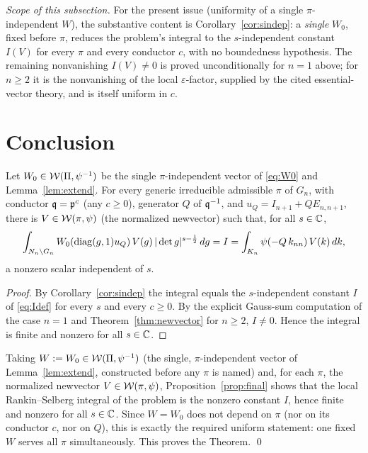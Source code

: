\medskip
\noindent\emph{Scope of this subsection.} For the present issue \textup{(}uniformity of a single
$\pi$-independent $W$\textup{)}, the substantive content is Corollary~\ref{cor:sindep}: a
\emph{single} $W_0$, fixed before $\pi$, reduces the problem's integral to the $s$-independent
constant $I(V)$ for every $\pi$ and every conductor $c$, with no boundedness hypothesis. The
remaining nonvanishing $I(V)\neq0$ is proved unconditionally for $n=1$ above; for $n\ge2$ it is
the nonvanishing of the local $\varepsilon$-factor, supplied by the cited essential-vector theory,
and is itself uniform in $c$.

\section*{Conclusion}

\begin{qtwoproposition}\label{prop:final}
Let $W_0\in\mathcal{W}(\Pi,\psi^{-1})$ be the single $\pi$-independent vector of \eqref{eq:W0} and
Lemma~\ref{lem:extend}. For every generic irreducible admissible $\pi$ of $G_n$, with conductor
$\mathfrak{q}=\mathfrak{p}^{c}$ \textup{(}any $c\ge0$\textup{)}, generator $Q$ of $\mathfrak{q}^{-1}$, and
$u_Q=I_{n+1}+QE_{n,n+1}$, there is $V\in\mathcal{W}(\pi,\psi)$ \textup{(}the normalized newvector\textup{)}
such that, for all $s\in\mathbb{C}$,
\[
\int_{N_n\backslash G_n} W_0(\operatorname{diag}(g,1)u_Q)\,V(g)\,|\det g|^{s-\frac12}\,dg
= I=\int_{K_n}\psi(-Q\,k_{nn})\,V(k)\,dk,
\]
a nonzero scalar independent of $s$.
\end{qtwoproposition}

\begin{proof}
By Corollary~\ref{cor:sindep} the integral equals the $s$-independent constant $I$ of
\eqref{eq:Idef} for every $s$ and every $c\ge0$. By the explicit Gauss-sum computation of the case
$n=1$ and Theorem~\ref{thm:newvector} for $n\ge2$, $I\neq0$. Hence the integral is finite and
nonzero for all $s\in\mathbb{C}$.
\end{proof}

Taking $W:=W_0\in\mathcal{W}(\Pi,\psi^{-1})$ \textup{(}the single, $\pi$-independent vector of
Lemma~\ref{lem:extend}, constructed before any $\pi$ is named\textup{)} and, for each $\pi$, the
normalized newvector $V\in\mathcal{W}(\pi,\psi)$, Proposition~\ref{prop:final} shows that the local
Rankin--Selberg integral of the problem is the nonzero constant $I$, hence finite and nonzero for
all $s\in\mathbb{C}$. Since $W=W_0$ does not depend on $\pi$ \textup{(}nor on its conductor $c$, nor on
$Q$\textup{)}, this is exactly the required uniform statement: one fixed $W$ serves all $\pi$
simultaneously. This proves the Theorem. \qed

